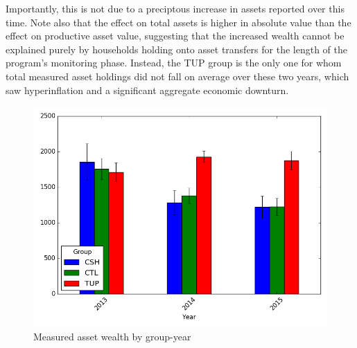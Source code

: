 \documentclass[12pt,article]{article}
\begin{document}
Importantly, this is not due to a preciptous increase in assets reported over this
time. Note also that the effect on total assets is higher in absolute value than the
effect on productive asset value, suggesting that the increased wealth cannot be
explained purely by households holding onto asset transfers for the length of the
program's monitoring phase. Instead, the TUP group is the only one for whom total
measured asset holdings did not fall on average over these two years, which saw
hyperinflation and a significant aggregate economic downturn.

\begin{figure}[htb]
\centering
\includegraphics[width=.9\linewidth]{../figures/AssetTotal_groupyear.png}
\caption{\label{fig:AssetTotal}Measured asset wealth by group-year}
\end{figure} 
\end{document}
